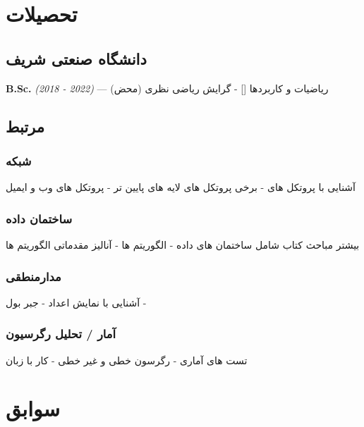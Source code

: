 \documentclass{article}
\begin{document}
\section{تحصیلات} %
\subsection{دانشگاه صنعتی شریف}
\textbf{B.Sc.} \textit{(2018 - 2022)} --- ریاضیات و کاربردها
[{\footnotesize {}}] -
گرایش ریاضی نظری (محض)
\subsection{مرتبط}
\subsubsection{شبکه}
آشنایی با پروتکل های  - برخی پروتکل های لایه های پایین تر - پروتکل های وب و ایمیل
\subsubsection{ساختمان داده}
بیشتر مباحث کتاب  شامل ساختمان های داده - الگوریتم ها - آنالیز مقدماتی الگوریتم ها
\subsubsection{مدارمنطقی}
آشنایی با نمایش اعداد - جبر بول - 
\subsubsection{آمار / تحلیل رگرسیون}
تست های آماری - رگرسون خطی و غیر خطی - کار با زبان 
\section{سوابق}
\end{document}
